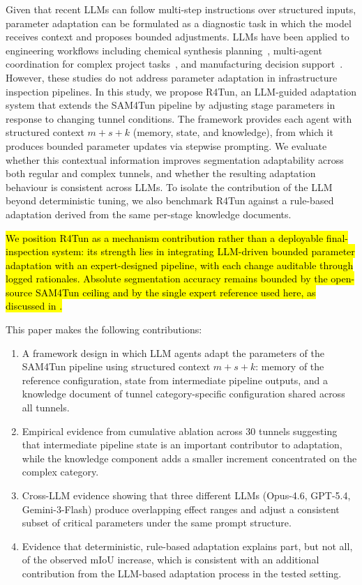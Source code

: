 \documentclass[a4paper,fleqn]{cas-dc}
\begin{document}
{Given that recent LLMs can follow multi-step instructions over structured inputs, parameter adaptation can be formulated as a diagnostic task in which the model receives context and proposes bounded adjustments. LLMs have been applied to engineering workflows including chemical synthesis planning~\citep{bran2024chemcrow}, multi-agent coordination for complex project tasks~\citep{qian2024chatdev, hong2024metagpt, chen2024comm}, and manufacturing decision support~\citep{garcia2024manufacturing}. However, these studies do not address parameter adaptation in infrastructure inspection pipelines. In this study, we propose R4Tun, an LLM-guided adaptation system that extends the SAM4Tun pipeline by adjusting stage parameters in response to changing tunnel conditions. The framework provides each agent with structured context $m+s+k$ (memory, state, and knowledge), from which it produces bounded parameter updates via stepwise prompting. We evaluate whether this contextual information improves segmentation adaptability across both regular and complex tunnels, and whether the resulting adaptation behaviour is consistent across LLMs. To isolate the contribution of the LLM beyond deterministic tuning, we also benchmark R4Tun against a rule-based adaptation derived from the same per-stage knowledge documents.

\hl{We position R4Tun as a mechanism contribution rather than a deployable final-inspection system: its strength lies in integrating LLM-driven bounded parameter adaptation with an expert-designed pipeline, with each change auditable through logged rationales. Absolute segmentation accuracy remains bounded by the open-source SAM4Tun ceiling and by the single expert reference used here, as discussed in .}

This paper makes the following contributions:
\begin{enumerate}
\item A framework design in which LLM agents adapt the parameters of the SAM4Tun pipeline using structured context $m+s+k$: memory of the reference configuration, state from intermediate pipeline outputs, and a knowledge document of tunnel category-specific configuration shared across all tunnels.
\item Empirical evidence from cumulative ablation across 30 tunnels suggesting that intermediate pipeline state is an important contributor to adaptation, while the knowledge component adds a smaller increment concentrated on the complex category.
\item Cross-LLM evidence showing that three different LLMs (Opus-4.6, GPT-5.4, Gemini-3-Flash) produce overlapping effect ranges and adjust a consistent subset of critical parameters under the same prompt structure.
\item Evidence that deterministic, rule-based adaptation explains part, but not all, of the observed mIoU increase, which is consistent with an additional contribution from the LLM-based adaptation process in the tested setting.
\end{enumerate}

}
\end{document}
